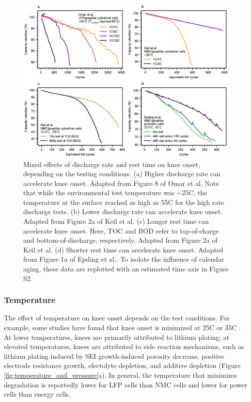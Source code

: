 \documentclass[journal=jpclcd,manuscript=article]{achemso}
\begin{document}
\begin{figure}[ht!]
\centering
\includegraphics[scale = 1.0]{figures/discharge_rate_rest_cycles.eps}
\caption{Mixed effects of discharge rate and rest time on knee onset, depending on the testing conditions. (a) Higher discharge rate can accelerate knee onset. Adapted from Figure 8 of Omar et al.\cite{omar_lithium_2014}
Note that while the environmental test temperature was $\sim$25\degree C, the temperature at the surface reached as high as 55\degree C for the high rate discharge tests.
(b) Lower discharge rate can accelerate knee onset. Adapted from Figure 2a of Keil et al.\cite{keil_linear_2019} (c) Longer rest time can accelerate knee onset. Here, TOC and BOD refer to top-of-charge and bottom-of-discharge, respectively. Adapted from  Figure 2a of Keil et al.\cite{keil_linear_2019} (d) Shorter rest time can accelerate knee onset. Adapted from Figure 1a of Epding et al.\cite{epding_investigation_2019}. To isolate the influence of calendar aging, these data are replotted with an estimated time axis in Figure S2.}
\label{fig:discharge-rest_cycle}
\end{figure}


\subsubsection{Temperature}
The effect of temperature on knee onset depends on the test conditions. For example, some studies have found that knee onset is minimized at 25\degree C \cite{zhang_accelerated_2019, waldmann_temperature_2014, waldmann_optimization_2015} or 35\degree C \cite{schuster_nonlinear_2015}{}. At lower temperatures, knees are primarily attributed to lithium plating; at elevated temperatures, knees are attributed to side reaction mechanisms, such as lithium plating induced by SEI growth-induced porosity decrease, positive electrode resistance growth, electolyte depletion, and additive depletion (Figure \ref{fig:temperature_and_pressure}a).\cite{broussely_main_2005, zhang_accelerated_2019,schuster_nonlinear_2015,waldmann_temperature_2014,waldmann_optimization_2015,stevens_using_2014} In general, the temperature that minimizes degradation is reportedly lower for LFP cells than NMC cells \cite{preger_degradation_2020} and lower for power cells than energy cells\cite{yang_understanding_2018}.
\end{document}
